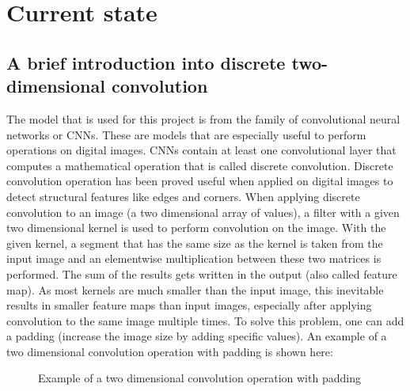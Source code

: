 \chapter{Current state}
\label{ch:currentState}

\section{A brief introduction into discrete two-dimensional convolution}

The model that is used for this project is from the family of convolutional neural networks or CNNs. These are models that are especially useful to perform operations on digital images. CNNs contain at least one convolutional layer that computes a mathematical operation that is called discrete convolution. Discrete convolution operation has been proved useful when applied on digital images to detect structural features like edges and corners. When applying discrete convolution to an image (a two dimensional array of values), a filter with a given two dimensional kernel is used to perform convolution on the image. With the given kernel, a segment that has the same size as the kernel is taken from the input image and an elementwise multiplication between these two matrices is performed. The sum of the results gets written in the output (also called feature map). As most kernels are much smaller than the input image, this inevitable results in smaller feature maps than input images, especially after applying convolution to the same image multiple times. To solve this problem, one can add a padding (increase the image size by adding specific values). An example of a two dimensional convolution operation with padding is shown here:

\begin{figure}[H]
	\caption{\label{fig:convolution} Example of a two dimensional convolution operation with padding}
\end{figure}

